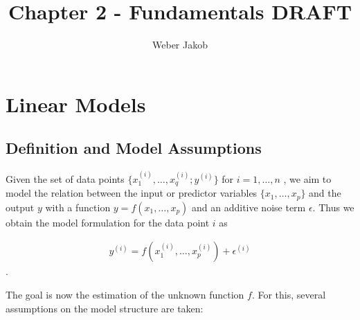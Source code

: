 \documentclass[10pt,a4paper]{article}
\title{Chapter 2 - Fundamentals DRAFT}
\author{Weber Jakob}
\begin{document}
\maketitle

\tableofcontents
\section{Linear Models} \label{sec:LinModel}
	
\subsection{Definition and Model Assumptions}  \label{subsec:LinModelDefAndAssump}

Given the set of data points $\{x^{(i)}_1, \dots, x^{(i)}_q; y^{(i)} \}$ for $i = 1, \dots, n$ , we aim to model the relation between the input or predictor variables $\{x_1, \dots, x_p\}$ and the output $y$ with a function $y = f(x_1, \dots, x_p)$ and an additive noise term $\epsilon$. Thus we obtain the model formulation for the data point $i$ as

\begin{align} \label{eq:lin_mod_single_data_point}
	y^{(i)} = f(x^{(i)}_{1}, \dots, x^{(i)}_{p}) + \epsilon^{(i)}
\end{align}.

The goal is now the estimation of the unknown function $f$. For this, several assumptions on the model structure are taken:
\end{document}
